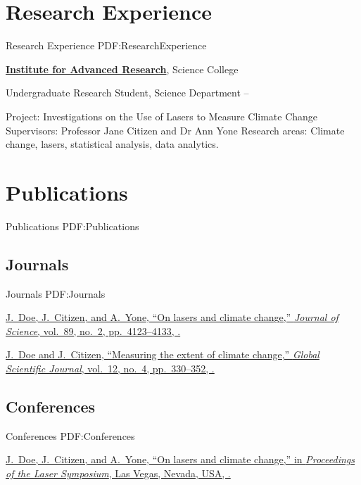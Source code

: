 \documentclass[a4paper,10pt,oneside]{article}
\begin{document}
\begin{body}

\section
{Research Experience}
{Research Experience}
{PDF:ResearchExperience}

\href{http://www.example.com/my-institute}
{\textbf{Institute for Advanced Research}},
Science College
\par
Undergraduate Research Student, Science Department
\hfill
{} --
\begin{detail}
\BulletItem
Project:
Investigations on the Use of Lasers to Measure Climate Change
\BulletItem
Supervisors:
Professor Jane Citizen and
Dr Ann Yone
\BulletItem
Research areas:
Climate change, lasers, statistical analysis, data analytics.
\end{detail}


\section
{Publications}
{Publications}
{PDF:Publications}

\subsection
{Journals}
{Journals}
{PDF:Journals}

\EntryGap
{}
\href{http://www.example.com/my-paper-doi-4}
{\underline{J.~Doe}, J.~Citizen, and A.~Yone,
``On lasers and climate change,''
\textit{Journal of Science},
vol.~89,
no.~2,
pp.~4123--4133,
.}

\EntryGap
{}
\href{http://www.example.com/my-paper-doi-3}
{\underline{J.~Doe} and J.~Citizen,
``Measuring the extent of climate change,''
\textit{Global Scientific Journal},
vol.~12,
no.~4,
pp.~330--352,
.}

\EntryGap
\subsection
{Conferences}
{Conferences}
{PDF:Conferences}

\EntryGap
{}
\href{http://www.example.com/my-paper-doi-2}
{\underline{J.~Doe}, J.~Citizen, and A.~Yone,
``On lasers and climate change,''
in \textit{Proceedings of the Laser Symposium},
Las Vegas, Nevada, USA,
.}


\end{body}
\end{document}
